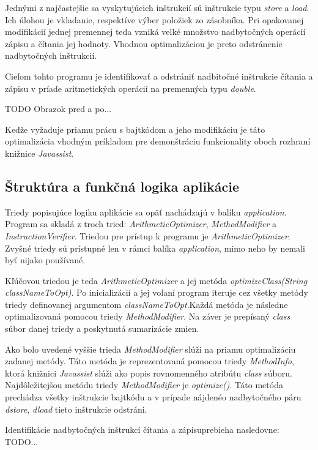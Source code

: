 \documentclass[11pt,final,oneside]{fithesis}
\begin{document}
Jednými z najčastejšie sa vyskytujúcich inštrukcií sú inštrukcie typu \textit{store} a \textit{load}. Ich úlohou je vkladanie, respektíve výber položiek zo zásobníka. Pri opakovanej modifikácií jednej premennej teda vzniká veľké množstvo nadbytočných operácií zápisu a čítania jej hodnoty. Vhodnou optimalizáciou je preto odstránenie nadbytočných inštrukcií.

Cieľom tohto programu je identifikovať a odstrániť nadbitočné inštrukcie čítania a zápisu v príade aritmetických operácií na premenných typu \textit{double}. 

TODO Obrazok pred a po...

Keďže vyžaduje priamu prácu s bajtkódom a jeho modifikáciu je táto optimalizácia vhodným príkladom pre demonštráciu funkcionality oboch rozhraní knižnice \textit{Javassist}.

\subsection{Štruktúra a funkčná logika aplikácie}
Triedy popisujúce logiku aplikácie sa opäť nachádzajú v balíku \textit{application}. Program sa skladá z troch tried: \textit{ArithmeticOptimizer}, \textit{MethodModifier} a \textit{InstructionVerifier}. Triedou pre prístup k programu je \textit{ArithmeticOptimizer}. Zvyšné triedy sú prístupné len v rámci balíka \textit{application}, mimo neho by nemali byť nijako používané.

Kľúčovou triedou je teda \textit{ArithmeticOptimizer} a jej metóda \textit{optimizeClass(String classNameToOpt)}. Po inicializácií a jej volaní program iteruje cez všetky metódy triedy definovanej argumentom \textit{classNameToOpt}.Každá metóda je následne optimalizovaná pomocou triedy \textit{MethodModifier}. Na záver je prepísaný \textit{class} súbor danej triedy a poskytnutá sumarizácie zmien.

Ako bolo uvedené vyššie trieda \textit{MethodModifier} slúži na priamu optimalizáciu zadanej metódy. Táto metóda je reprezentovaná pomocou triedy \textit{MethodInfo}, ktorá knižnici \textit{Javassist} slúži ako popis rovnomenného atribútu \textit{class} súboru. Najdôležitejšou metódu triedy \textit{MethodModifier} je \textit{optimize()}. Táto metóda prechádza všetky inštrukcie bajtkódu a v prípade nájdenéo nadbytočného páru \textit{dstore}, \textit{dload} tieto inštrukcie odstráni.

Identifikácie nadbytočných inštrukcí čítania a zápisuprebieha nasledovne:
TODO...
\end{document}
